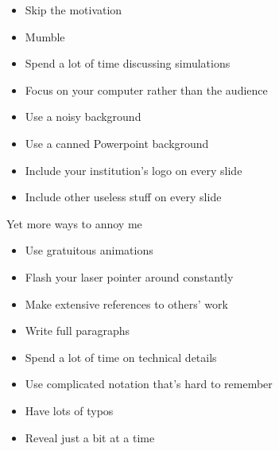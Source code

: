 \documentclass[12pt]{article}
\newcommand{\headsize}{\fontsize{35}{35} \selectfont}
\newcommand{\smallsize}{\fontsize{25}{30} \selectfont}
\begin{document}
\hfill \begin{minipage}{9.5in}

\begin{itemize}
\itemsep18pt

\item Skip the motivation

\item Mumble

\item Spend a lot of time discussing simulations

\item Focus on your computer rather than the audience

\item Use a noisy background

\item Use a canned Powerpoint background

\item Include your institution's logo on every slide

\item Include other useless stuff on every slide

\end{itemize}

\end{minipage}


\newpage

\headsize \color{myyellow}
\hfill \begin{minipage}{6.25in}
\centering
Yet more ways to annoy me
\end{minipage}

\vspace{30mm} \color{mywhite} \smallsize

\hfill \begin{minipage}{9.5in}

\begin{itemize}
\itemsep18pt

\item Use gratuitous animations

\item Flash your laser pointer around constantly 

\item Make extensive references to others' work

\item Write full paragraphs
\item Spend a lot of time on technical details

\item Use complicated notation that's hard to remember

\item Have lots of typos

\item Reveal just a bit at a time

\end{itemize}

\end{minipage}
\end{document}
